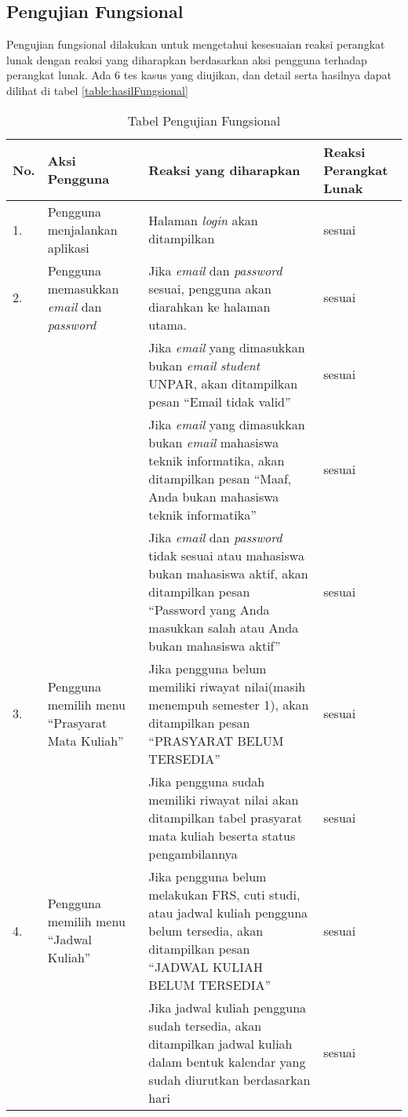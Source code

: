 			\subsection{Pengujian Fungsional} 
			Pengujian fungsional dilakukan untuk mengetahui kesesuaian reaksi perangkat lunak dengan reaksi yang diharapkan berdasarkan aksi pengguna terhadap perangkat lunak. Ada 6 tes kasus yang diujikan, dan detail serta hasilnya dapat dilihat di tabel \ref{table:hasilFungsional}
			
			\begin{table}[H]
			\centering
			\caption{Tabel Pengujian Fungsional}
				\begin{tabular}{|p{0.5cm}| p{5cm}| p{6cm}| p{1.75cm}|} \hline
				No.	&	Aksi Pengguna	&	Reaksi yang diharapkan	&	Reaksi Perangkat Lunak \\ \hline
				1.	&	Pengguna menjalankan aplikasi	&	Halaman \textit{login} akan ditampilkan	&	sesuai	\\ \hline
				2.	&	Pengguna memasukkan \textit{email} dan \textit{password}	&	Jika \textit{email} dan \textit{password}	sesuai, pengguna akan diarahkan ke halaman utama. & sesuai\\ \hline
					&	&	Jika \textit{email} yang dimasukkan bukan \textit{email} \textit{student} UNPAR, akan ditampilkan pesan ``Email tidak valid''&	sesuai	\\ \hline
					&	&	Jika \textit{email} yang dimasukkan bukan \textit{email} mahasiswa teknik informatika, akan ditampilkan pesan ``Maaf, Anda bukan mahasiswa teknik informatika''	&	sesuai	\\ \hline
					&	&	Jika \textit{email} dan \textit{password} tidak sesuai atau mahasiswa bukan mahasiswa aktif, akan ditampilkan pesan ``Password yang Anda masukkan salah atau Anda bukan mahasiswa aktif''	&	sesuai	\\ \hline
				3.	&	Pengguna memilih menu ``Prasyarat Mata Kuliah'' &	Jika pengguna belum memiliki riwayat nilai(masih menempuh semester 1), akan ditampilkan pesan ``PRASYARAT BELUM TERSEDIA''	&	sesuai	\\ \hline
					&	&	Jika pengguna sudah memiliki riwayat nilai	akan ditampilkan tabel prasyarat mata kuliah beserta status pengambilannya &	sesuai	\\ \hline
				4.	&	Pengguna memilih menu ``Jadwal Kuliah'' &	Jika pengguna belum melakukan FRS, cuti studi, atau jadwal kuliah pengguna belum tersedia, akan ditampilkan pesan ``JADWAL KULIAH BELUM TERSEDIA''	&	sesuai	\\ \hline
					&	&	Jika jadwal kuliah pengguna sudah tersedia, akan ditampilkan jadwal kuliah dalam bentuk kalendar yang sudah diurutkan berdasarkan hari &	sesuai	\\ \hline

\end{tabular}
\end{table}
